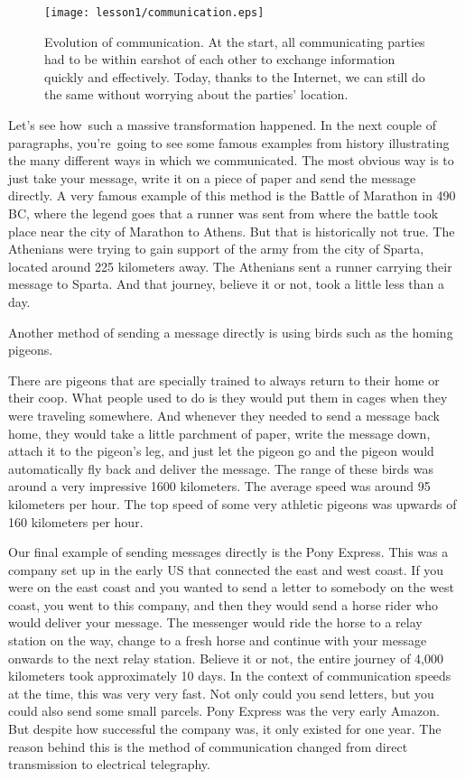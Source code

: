 \begin{figure}[h]
    \centering
    \texttt{[image: lesson1/communication.eps]}
    \caption[Evolution of communication]{Evolution of communication. At the start, all communicating parties had to be within earshot of each other to exchange information quickly and effectively. Today, thanks to the Internet, we can still do the same without worrying about the parties' location.}
    \label{fig:1-1_communication}
\end{figure}

Let's see how such a massive transformation happened.
In the next couple of paragraphs, you're going to see some famous examples from history illustrating the many different ways in which we communicated.
The most obvious way is to just take your message, write it on a piece of paper and send the message directly.
A very famous example of this method is the Battle of Marathon in 490 BC, where the legend goes that a runner was sent from where the battle took place near the city of Marathon to Athens.
But that is historically not true.
The Athenians were trying to gain support of the army from the city of Sparta, located around 225 kilometers away.
The Athenians sent a runner carrying their message to Sparta.
And that journey, believe it or not, took a little less than a day.

Another method of sending a message directly is using birds such as the homing pigeons.

There are pigeons that are specially trained to always return to their home or their coop. What people used to do is they would put them in cages when they were traveling somewhere. And whenever they needed to send a message back home, they would take a little parchment of paper, write the message down, attach it to the pigeon's leg, and just let the pigeon go and the pigeon would automatically fly back and deliver the message.
The range of these birds was around a very impressive 1600 kilometers.
The average speed was around 95 kilometers per hour.
The top speed of some very athletic pigeons was upwards of 160 kilometers per hour.

Our final example of sending messages directly is the Pony Express.
This was a company set up in the early US that connected the east and west coast.
If you were on the east coast and you wanted to send a letter to somebody on the west coast, you went to this company, and then they would send a horse rider who would deliver your message.
The messenger would ride the horse to a relay station on the way, change to a fresh horse and continue with your message onwards to the next relay station.
Believe it or not, the entire journey of 4,000 kilometers took approximately 10 days.
In the context of communication speeds at the time, this was very very fast.
Not only could you send letters, but you could also send some small parcels.
Pony Express was the very early Amazon.
But despite how successful the company was, it only existed for one year.
The reason behind this is the method of communication changed from direct transmission to electrical telegraphy.

